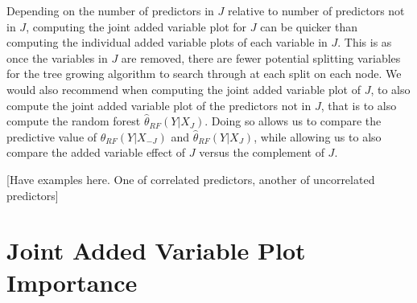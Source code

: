 \documentclass[12pt,twoside]{reedthesis}
\theoremstyle{definition}
\theoremstyle{definition}
\theoremstyle{definition}
\theoremstyle{remark}
\begin{document}
Depending on the number of predictors in \(J\) relative to number of
predictors not in \(J\), computing the joint added variable plot for
\(J\) can be quicker than computing the individual added variable plots
of each variable in \(J\). This is as once the variables in \(J\) are
removed, there are fewer potential splitting variables for the tree
growing algorithm to search through at each split on each node. We would
also recommend when computing the joint added variable plot of \(J\), to
also compute the joint added variable plot of the predictors not in
\(J\), that is to also compute the random forest
\(\hat{\theta}_{RF}(Y|X_J)\). Doing so allows us to compare the
predictive value of \(\hat{\theta}_{RF}(Y|X_{-J})\) and
\(\hat{\theta}_{RF}(Y|X_J)\), while allowing us to also compare the
added variable effect of \(J\) versus the complement of \(J\).

{[}Have examples here. One of correlated predictors, another of
uncorrelated predictors{]}

\section{Joint Added Variable Plot
Importance}\label{joint-added-variable-plot-importance-1}
\end{document}
